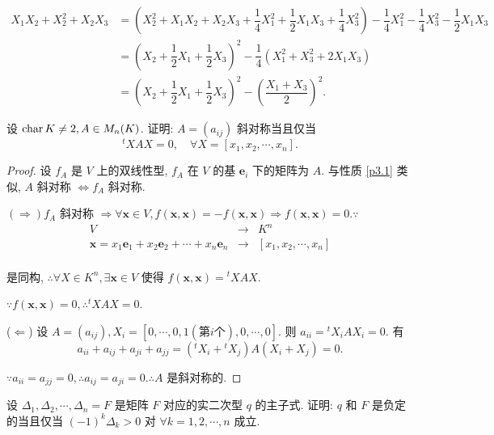 \documentclass{ctexart}
\begin{document}
\begin{solution}
    \begin{align*}
        X_1X_2+X_2^2+X_2X_3 & =\left(X_2^2+X_1X_2+X_2X_3+\dfrac{1}{4}X_1^2+\dfrac{1}{2}X_1X_3+\dfrac{1}{4}X_3^2\right)-\dfrac{1}{4}X_1^2-\dfrac{1}{4}X_3^2-\dfrac{1}{2}X_1X_3 \\
        & =\left(X_2+\dfrac{1}{2}X_1+\dfrac{1}{2}X_3\right)^2-\dfrac{1}{4}(X_1^2+X_3^2+2X_1X_3) \\
        & =\left(X_2+\dfrac{1}{2}X_1+\dfrac{1}{2}X_3\right)^2-\left(\dfrac{X_1+X_3}{2}\right)^2.
    \end{align*}
\end{solution}
\begin{exercisec}%
    设 $\operatorname{char}  K\neq 2,A\in M_n(K)$. 证明: $A=(a_{ij})$ 斜对称当且仅当
    \[{}^tXAX=0,\quad\forall X=[x_1,x_2,\cdots,x_n].\]
\end{exercisec}
\begin{proof}
    设 $f_A$ 是 $V$ 上的双线性型, $f_A$ 在 $V$ 的基 $\boldsymbol{e}_i$ 下的矩阵为 $A$. 与性质 \ref{p3.1} 类似, $A$ 斜对称 $\Leftrightarrow f_A$ 斜对称.

    $(\Rightarrow)f_A$ 斜对称 $\Rightarrow\forall\boldsymbol{x}\in V,f(\boldsymbol{x},\boldsymbol{x})=-f(\boldsymbol{x},\boldsymbol{x})\Rightarrow f(\boldsymbol{x},\boldsymbol{x})=0.\because$
    \[\begin{array}{rcl}
        V & \to & K^n \\
        \boldsymbol{x}=x_1\boldsymbol{e}_1+x_2\boldsymbol{e}_2+\cdots+x_n\boldsymbol{e}_n & \to & [x_1,x_2,\cdots,x_n] \\
    \end{array}\]

    是同构, $\therefore\forall X\in K^n,\exists\boldsymbol{x}\in V$ 使得 $f(\boldsymbol{x},\boldsymbol{x})={}^tXAX$.

    $\because f(\boldsymbol{x},\boldsymbol{x})=0,\therefore{}^tXAX=0$.

    ($\Leftarrow$) 设 $A=(a_{ij}),X_i=[0,\cdots,0,1(\text{第}i\text{个}),0,\cdots,0]$. 则 $a_{ii}={}^tX_iAX_i=0$. 有
    \[a_{ii}+a_{ij}+a_{ji}+a_{jj}=({}^tX_i+{}^tX_j)A(X_i+X_j)=0.\]

    $\because a_{ii}=a_{jj}=0,\therefore a_{ij}=a_{ji}=0.\therefore A$ 是斜对称的.
\end{proof}
\begin{exercise}\label{ex4.1}
    设 $\Delta_1,\Delta_2,\cdots,\Delta_n=F$ 是矩阵 $F$ 对应的实二次型 $q$ 的主子式. 证明: $q$ 和 $F$ 是负定的当且仅当 $(-1)^k\Delta_k>0$ 对 $\forall k=1,2,\cdots,n$ 成立.
\end{exercise}
\end{document}
